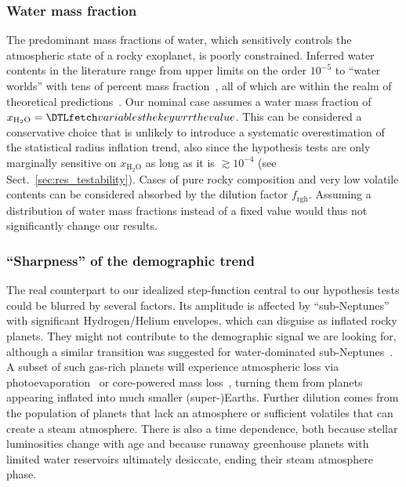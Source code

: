 \documentclass[twocolumn,twocolappendix]{aastex631}
\begin{document}
\subsubsection{Water mass fraction}
The predominant mass fractions of water, which sensitively controls the atmospheric state of a rocky exoplanet, is poorly constrained.
Inferred water contents in the literature range from upper limits on the order $10^{-5}$ to ``water worlds'' with tens of percent mass fraction~\citep[e.g.,][]{Rogers2010,Unterborn2018,Mousis2020,Agol2021,Luque2022}, all of which are within the realm of theoretical predictions~\citep{Mulders2015b,Sato2016,Jin2018,Lichtenberg2019,Bitsch2019b,Venturini2020,Emsenhuber2021b,Schlecker2021,2022ApJ...938L...3L,2022ApJ...939L..19I}.
Our nominal case assumes a water mass fraction of $x_\mathrm{H_2O} = \var{wrr}$.
This can be considered a conservative choice that is unlikely to introduce a systematic overestimation of the statistical radius inflation trend, also since the hypothesis tests are only marginally sensitive on $x_\mathrm{H_2O}$ as long as it is $\gtrsim 10^{-4}$ (see Sect.~\ref{sec:res_testability}).
Cases of pure rocky composition and very low volatile contents can be considered absorbed by the dilution factor $f_\mathrm{rgh}$.
Assuming a distribution of water mass fractions instead of a fixed value would thus not significantly change our results.

\subsubsection{``Sharpness'' of the demographic trend}
The real counterpart to our idealized step-function central to our hypothesis tests could be blurred by several factors.
Its amplitude is affected by ``sub-Neptunes'' with significant Hydrogen/Helium envelopes, which can disguise as inflated rocky planets.
They might not contribute to the demographic signal we are looking for, although a similar transition was suggested for water-dominated sub-Neptunes~\citep{Pierrehumbert2022}.
A subset of such gas-rich planets will experience atmospheric loss via photoevaporation~\citep{Owen2013} or core-powered mass loss~\citep{Ginzburg2018}, turning them from planets appearing inflated into much smaller \mbox{(super-)Earths}.
Further dilution comes from the population of planets that lack an atmosphere or sufficient volatiles that can create a steam atmosphere.
There is also a time dependence, both because stellar luminosities change with age and because runaway greenhouse planets with limited water reservoirs ultimately desiccate, ending their steam atmosphere phase.
\end{document}
